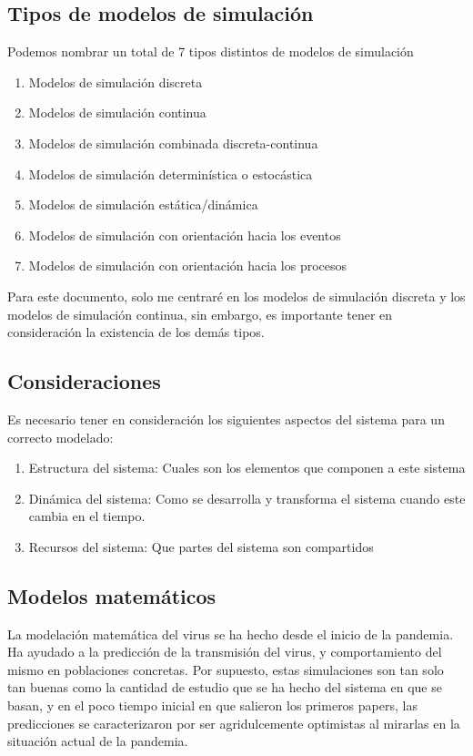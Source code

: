 \subsection*{Tipos de modelos de simulación}
Podemos nombrar un total de 7 tipos distintos de modelos de simulación

\begin{enumerate}
    \item Modelos de simulación discreta
    \item Modelos de simulación continua
    \item Modelos de simulación combinada discreta-continua
    \item Modelos de simulación determinística o estocástica
    \item Modelos de simulación estática/dinámica
    \item Modelos de simulación con orientación hacia los eventos
    \item Modelos de simulación con orientación hacia los procesos
\end{enumerate}

Para este documento, solo me centraré en los modelos de simulación discreta y los modelos de simulación continua, sin embargo, es importante tener en consideración la existencia de los demás tipos.

\subsection*{Consideraciones}
Es necesario tener en consideración los siguientes aspectos del sistema para un correcto modelado:

\begin{enumerate}
    \item Estructura del sistema: Cuales son los elementos que componen a este sistema
    \item Dinámica del sistema: Como se desarrolla y transforma el sistema cuando este cambia en el tiempo.
    \item Recursos del sistema: Que partes del sistema son compartidos
\end{enumerate}


\subsection{Modelos matemáticos}
La modelación matemática del virus se ha hecho desde el inicio de la pandemia. Ha ayudado a la predicción de la transmisión del virus, y comportamiento del mismo en poblaciones concretas. Por supuesto, estas simulaciones son tan solo tan buenas como la cantidad de estudio que se ha hecho del sistema en que se basan, y en el poco tiempo inicial en que salieron los primeros papers, las predicciones se caracterizaron por ser agridulcemente optimistas al mirarlas en la situación actual de la pandemia.

